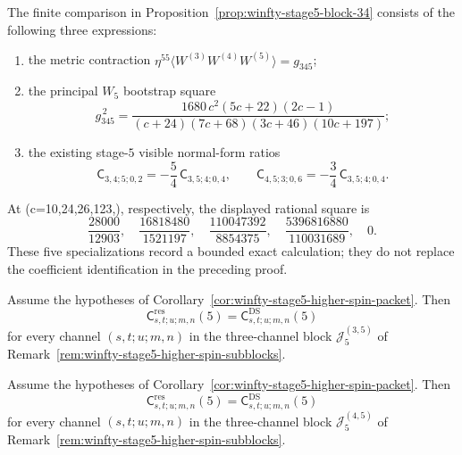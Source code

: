 \begin{computation}
\label{comp:winfty-stage5-block34-coefficient}
The finite comparison in
Proposition~\ref{prop:winfty-stage5-block-34} consists of the following
three expressions:
\begin{enumerate}[label=\textup{(\roman*)}]
\item the metric contraction
\(\eta^{55}\langle W^{(3)}W^{(4)}W^{(5)}\rangle=g_{345}\);
\item the principal \(W_5\) bootstrap square
\[
g_{345}^{\,2}
=
\frac{1680\,c^2(5c+22)(2c-1)}
{(c+24)(7c+68)(3c+46)(10c+197)};
\]
\item the existing stage-$5$ visible normal-form ratios
\[
\mathsf{C}_{3,4;5;0,2}
=-\frac54\,\mathsf{C}_{3,5;4;0,4},
\qquad
\mathsf{C}_{4,5;3;0,6}
=-\frac34\,\mathsf{C}_{3,5;4;0,4}.
\]
\end{enumerate}
At (c=10,24,26,123,), respectively, the displayed rational
square is
\[
 \frac{28000}{12903},\quad
 \frac{16818480}{1521197},\quad
 \frac{110047392}{8854375},\quad
 \frac{5396816880}{110031689},\quad 0.
\]
These five specializations record a bounded exact calculation; they do
not replace the coefficient identification in the preceding proof.
\end{computation}

\begin{proposition}
\label{prop:winfty-stage5-block-35}
\ClaimStatusConditional{}
Assume the hypotheses of
Corollary~\ref{cor:winfty-stage5-higher-spin-packet}. Then
\[
\mathsf{C}^{\mathrm{res}}_{s,t;u;m,n}(5)
=
\mathsf{C}^{\mathrm{DS}}_{s,t;u;m,n}(5)
\]
for every channel $(s,t;u;m,n)$ in the three-channel block
$\mathcal{J}_5^{(3,5)}$ of
Remark~\ref{rem:winfty-stage5-higher-spin-subblocks}.
\end{proposition}

\begin{proposition}
\label{prop:winfty-stage5-block-45}
\ClaimStatusConditional{}
Assume the hypotheses of
Corollary~\ref{cor:winfty-stage5-higher-spin-packet}. Then
\[
\mathsf{C}^{\mathrm{res}}_{s,t;u;m,n}(5)
=
\mathsf{C}^{\mathrm{DS}}_{s,t;u;m,n}(5)
\]
for every channel $(s,t;u;m,n)$ in the three-channel block
$\mathcal{J}_5^{(4,5)}$ of
Remark~\ref{rem:winfty-stage5-higher-spin-subblocks}.
\end{proposition}

